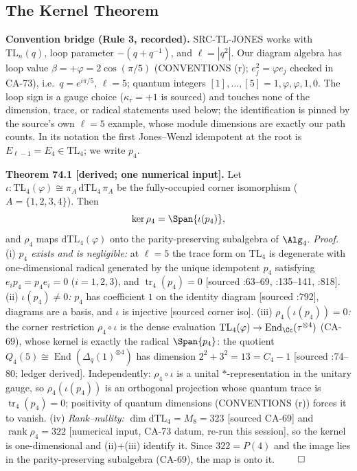 \subsection{The Kernel Theorem}

\textbf{Convention bridge (Rule 3, recorded).}  SRC-TL-JONES works with
\(\mathrm{TL}_n(q)\), loop parameter \(-(q+q^{-1})\), and \(\ell=|q^2|\).
Our diagram algebra has loop value \(\beta=+\varphi=2\cos(\pi/5)\)
(CONVENTIONS (r); \(e_j^2=\varphi e_j\) checked in CA-73), i.e.\
\(q=e^{i\pi/5}\), \(\ell=5\); quantum integers
\([1],\dots,[5]=1,\varphi,\varphi,1,0\).  The loop sign is a gauge choice
(\(\kappa_\tau=+1\) is sourced) and touches none of the dimension, trace,
or radical statements used below; the identification is pinned by the
source's own \(\ell=5\) example, whose module dimensions are exactly our
path counts.  In its notation the first Jones--Wenzl idempotent at the root
is \(E_{\ell-1}=E_4\in\mathrm{TL}_4\); we write \(p_4\).

\textbf{Theorem 74.1 [derived; one numerical input].}  Let
\(\iota:\mathrm{TL}_4(\varphi)\cong\pi_A\,\mathrm{dTL}_4\,\pi_A\) be the
fully-occupied corner isomorphism (\(A=\{1,2,3,4\}\)).  Then
\[
  \ker\rho_4=\Span\{\iota(p_4)\},
\]
and \(\rho_4\) maps \(\mathrm{dTL}_4(\varphi)\) onto the parity-preserving
subalgebra of \(\Alg_4\).  \emph{Proof.}
(i) \emph{\(p_4\) exists and is negligible:} at \(\ell=5\) the trace form
on \(\mathrm{TL}_4\) is degenerate with one-dimensional radical generated
by the unique idempotent \(p_4\) satisfying \(e_ip_4=p_4e_i=0\)
(\(i=1,2,3\)), and \(\operatorname{tr}_4(p_4)=0\) [sourced :63--69,
:135--141, :818].
(ii) \emph{\(\iota(p_4)\neq0\):} \(p_4\) has coefficient \(1\) on the
identity diagram [sourced :792], diagrams are a basis, and \(\iota\) is
injective [sourced corner iso].
(iii) \emph{\(\rho_4(\iota(p_4))=0\):} the corner restriction
\(\rho_4\circ\iota\) is the dense evaluation
\(\mathrm{TL}_4(\varphi)\to\operatorname{End}_{\Cc}(\tau^{\otimes4})\)
(CA-69), whose kernel is exactly the radical \(\Span\{p_4\}\): the quotient
\(Q_4(5)\cong\operatorname{End}(\Delta_q(1)^{\otimes4})\) has dimension
\(2^2+3^2=13=C_4-1\) [sourced :74--80; ledger derived].  Independently:
\(\rho_4\circ\iota\) is a unital \(*\)-representation in the unitary gauge,
so \(\rho_4(\iota(p_4))\) is an orthogonal projection whose quantum trace
is \(\operatorname{tr}_4(p_4)=0\); positivity of quantum dimensions
(CONVENTIONS (r)) forces it to vanish.
(iv) \emph{Rank--nullity:} \(\dim\mathrm{dTL}_4=M_8=323\) [sourced CA-69]
and \(\operatorname{rank}\rho_4=322\) [numerical input, CA-73 datum, re-run
this session], so the kernel is one-dimensional and (ii)+(iii) identify it.
Since \(322=P(4)\) and the image lies in the parity-preserving subalgebra
(CA-69), the map is onto it. \(\qed\)

